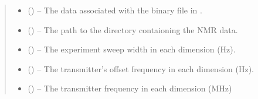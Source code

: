 \documentclass[letterpaper,10pt,english]{sphinxmanual}
\begin{document}
\begin{fulllineitems}
\begin{quote}
\begin{description}
\begin{itemize}
\item {} 
\sphinxAtStartPar
{} () – The data associated with the binary file in .

\item {} 
\sphinxAtStartPar
{} () – The path to the directory contaioning the NMR data.

\item {} 
\sphinxAtStartPar
{} (\sphinxstyleliteralemphasis{\sphinxupquote{{[}}}\sphinxstyleliteralemphasis{\sphinxupquote{{]} or }}\sphinxstyleliteralemphasis{\sphinxupquote{{[}}}\sphinxstyleliteralemphasis{\sphinxupquote{, }}\sphinxstyleliteralemphasis{\sphinxupquote{{]}}}) – The experiment sweep width in each dimension (Hz).

\item {} 
\sphinxAtStartPar
{} (\sphinxstyleliteralemphasis{\sphinxupquote{{[}}}\sphinxstyleliteralemphasis{\sphinxupquote{{]} or }}\sphinxstyleliteralemphasis{\sphinxupquote{{[}}}\sphinxstyleliteralemphasis{\sphinxupquote{, }}\sphinxstyleliteralemphasis{\sphinxupquote{{]}}}) – The transmitter’s offset frequency in each dimension (Hz).

\item {} 
\sphinxAtStartPar
{} (\sphinxstyleliteralemphasis{\sphinxupquote{{[}}}\sphinxstyleliteralemphasis{\sphinxupquote{{]} or }}\sphinxstyleliteralemphasis{\sphinxupquote{{[}}}\sphinxstyleliteralemphasis{\sphinxupquote{, }}\sphinxstyleliteralemphasis{\sphinxupquote{{]} or }}) – The transmitter frequency in each dimension (MHz)


\end{itemize}
\end{description}
\end{quote}
\end{fulllineitems}
\end{document}
